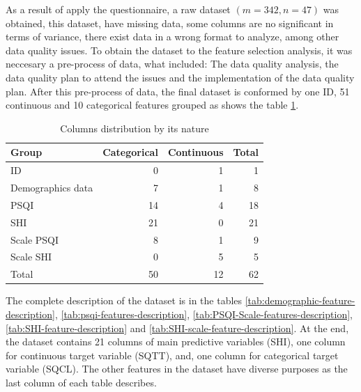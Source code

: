 \documentclass[]{book}
\begin{document}
As a result of apply the questionnaire, a raw dataset \((m=342, n=47)\)
was obtained, this dataset, have missing data, some columns are no
significant in terms of variance, there exist data in a wrong format to
analyze, among other data quality issues. To obtain the dataset to the
feature selection analysis, it was neccesary a pre-process of data, what
included: The data quality analysis, the data quality plan to attend the
issues and the implementation of the data quality plan. After this
pre-process of data, the final dataset is conformed by one ID, 51
continuous and 10 categorical features grouped as shows the table
\ref{tab:dataset-columns-distribution}.

\begin{table}[ht]
\centering
\caption{Columns distribution by its nature}
\label{tab:dataset-columns-distribution}
\begin{tabular}{lrrr}
\hline
Group             & Categorical & Continuous & Total \\ \hline
ID                & 0           & 1          & 1     \\
Demographics data & 7           & 1          & 8     \\
PSQI              & 14          & 4          & 18    \\
SHI               & 21          & 0          & 21    \\
Scale PSQI        & 8           & 1          & 9     \\
Scale SHI         & 0           & 5          & 5     \\ \hline
Total             & 50          & 12         & 62    \\ \hline
\end{tabular}
\end{table}

The complete description of the dataset is in the tables
\ref{tab:demographic-feature-description},
\ref{tab:psqi-features-description},
\ref{tab:PSQI-Scale-features-description},
\ref{tab:SHI-feature-description} and
\ref{tab:SHI-scale-feature-description}. At the end, the dataset
contains 21 columns of main predictive variables (SHI), one column for
continuous target variable (SQTT), and, one column for categorical
target variable (SQCL). The other features in the dataset have diverse
purposes as the last column of each table describes.
\end{document}
